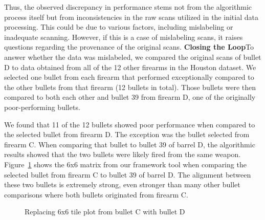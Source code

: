 \documentclass[
  12pt]{article}
\begin{document}
Thus, the observed discrepancy in performance stems not from the
algorithmic process itself but from inconsistencies in the raw scans
utilized in the initial data processing. This could be due to various
factors, including mislabeling or inadequate scanning. However, if this
is a case of mislabeling scans, it raises questions regarding the
provenance of the original scans. \hfill\newline\noindent
\textbf{Closing the Loop}\hfill\newline To answer whether the data was
mislabeled, we compared the original scans of bullet D to data obtained
from all of the 12 other firearms in the Houston dataset. We selected
one bullet from each firearm that performed exceptionally compared to
the other bullets from that firearm (12 bullets in total). Those bullets
were then compared to both each other and bullet 39 from firearm D, one
of the originally poor-performing bullets.

We found that 11 of the 12 bullets showed poor performance when compared
to the selected bullet from firearm D. The exception was the bullet
selected from firearm C. When comparing that bullet to bullet 39 of
barrel D, the algorithmic results showed that the two bullets were
likely fired from the same weapon. Figure~\ref{fig-CD-Comparison} shows
the 6x6 matrix from our framework tool when comparing the selected
bullet from firearm C to bullet 39 of barrel D. The alignment between
these two bullets is extremely strong, even stronger than many other
bullet comparisons where both bullets originated from firearm C.

\begin{figure}[H]


\caption{\label{fig-CD-Comparison}Replacing 6x6 tile plot from bullet C
with bullet D}

\end{figure}%
\end{document}
